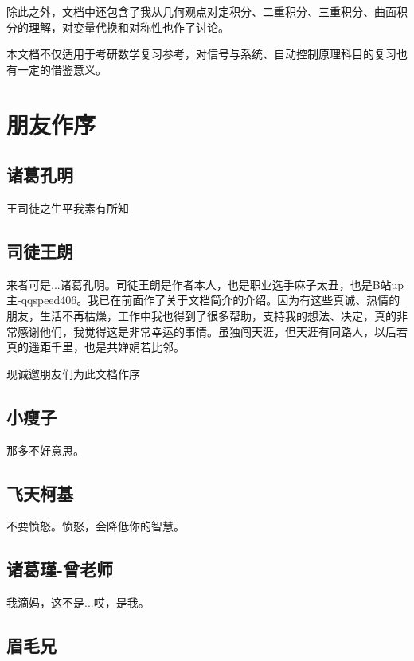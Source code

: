 \documentclass[12pt]{report}
\begin{document}
除此之外，文档中还包含了我从几何观点对定积分、二重积分、三重积分、曲面积分的理解，对变量代换和对称性也作了讨论。

本文档不仅适用于考研数学复习参考，对信号与系统、自动控制原理科目的复习也有一定的借鉴意义。

 \chapter*{朋友作序}
 \section*{\textbullet \hspace{0.5em}诸葛孔明}
 
 \mfMicroscope 王司徒之生平我素有所知
 
 \section*{\textbullet \hspace{0.5em}司徒王朗}
 
 来者可是...诸葛孔明。司徒王朗是作者本人，也是职业选手麻子太丑，也是B站up主-qqspeed406。我已在前面作了关于文档简介的介绍。因为有这些真诚、热情的朋友，生活不再枯燥，工作中我也得到了很多帮助，支持我的想法、决定，真的非常感谢他们，我觉得这是非常幸运的事情。虽独闯天涯，但天涯有同路人，以后若真的遥距千里，也是共婵娟若比邻。
 
 现诚邀朋友们为此文档作序
 
  \section*{\textbullet \hspace{0.5em}小瘦子}

 那多不好意思。  
   
 \section*{\textbullet \hspace{0.5em}飞天柯基} 
   
 不要愤怒。愤怒，会降低你的智慧。
 
 \section*{诸葛瑾-曾老师}
 
 我滴妈，这不是...哎，是我。
 
 \section*{眉毛兄}
 
\end{document}
